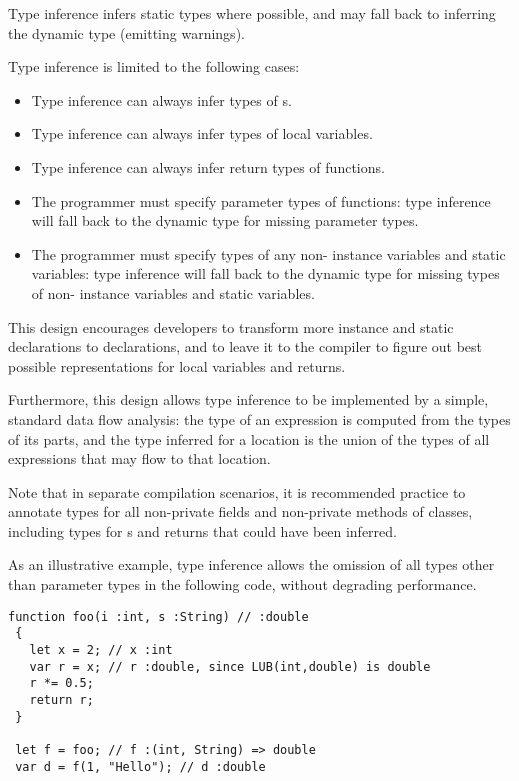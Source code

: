 Type inference
infers static types where possible, and may fall back to inferring the
dynamic type (emitting warnings).

Type inference is limited to the following cases:

\begin{itemize}
\item Type inference can always infer types of s.

\item Type inference can always infer types of local variables.

\item Type inference can always infer return types of functions.

\item The programmer must specify parameter types of functions: type
  inference will fall back to the dynamic type for missing parameter types.

\item The programmer must specify types of any non- instance variables and
  static variables: type
  inference will fall back to the dynamic type for missing types of non-
  instance variables and static variables.
\end{itemize}

This design encourages developers to transform more instance and static
 declarations to  declarations, and to leave it to the
compiler to figure out best possible representations for local variables and returns.

Furthermore, this design allows type inference to be implemented by a
simple, standard data flow analysis: the type of
an expression is computed from the types of its parts, and the type
inferred for a location is the union of the types of all expressions
that may flow to that location.

Note that in separate compilation scenarios, it is recommended
practice to annotate types for all non-private fields and non-private
methods of classes, including types for s and returns that could have
been inferred.

As an illustrative example, type inference allows the omission of all types other
than parameter types in the following code, without degrading performance.

\begin{verbatim}
function foo(i :int, s :String) // :double
 {
   let x = 2; // x :int
   var r = x; // r :double, since LUB(int,double) is double
   r *= 0.5;
   return r;
 }

 let f = foo; // f :(int, String) => double
 var d = f(1, "Hello"); // d :double
\end{verbatim}

